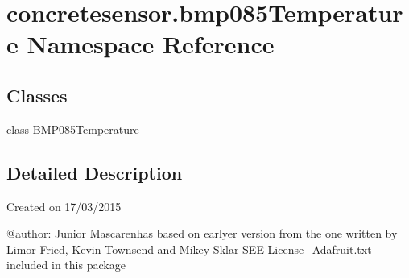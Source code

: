 \hypertarget{namespaceconcretesensor_1_1bmp085Temperature}{}\section{concretesensor.\+bmp085\+Temperature Namespace Reference}
\label{namespaceconcretesensor_1_1bmp085Temperature}
\subsection*{Classes}
\begin{DoxyCompactItemize}
\item 
class \hyperlink{classconcretesensor_1_1bmp085Temperature_1_1BMP085Temperature}{B\+M\+P085\+Temperature}
\end{DoxyCompactItemize}


\subsection{Detailed Description}
\begin{DoxyVerb}Created on 17/03/2015

@author: Junior Mascarenhas
based on earlyer version from
the one written by Limor Fried, Kevin Townsend and Mikey Sklar
SEE License_Adafruit.txt included in this package
\end{DoxyVerb}
 